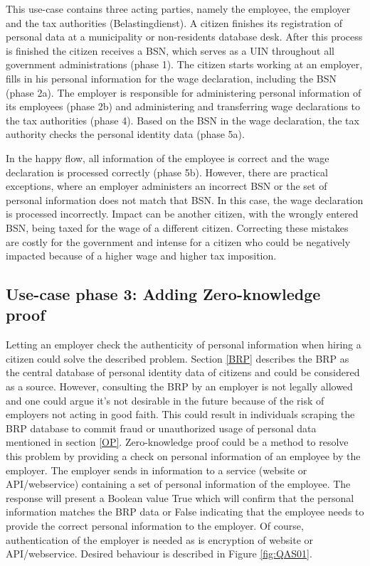 This use-case contains three acting parties, namely the employee, the employer and the tax authorities (Belastingdienst).
A citizen finishes its registration of personal data at a municipality or non-residents database desk. After this process is finished the citizen receives a BSN, which serves as a UIN throughout all government administrations (phase 1). The citizen starts working at an employer, fills in his personal information for the wage declaration, including the BSN (phase 2a). The employer is responsible for administering personal information of its employees (phase 2b) and administering and transferring wage declarations to the tax authorities (phase 4). Based on the BSN in the wage declaration, the tax authority checks the personal identity data (phase 5a). \par
In the happy flow, all information of the employee is correct and the wage declaration is processed correctly (phase 5b). However, there are practical exceptions, where an employer administers an incorrect BSN or the set of personal information does not match that BSN. In this case, the wage declaration is processed incorrectly. Impact can be another citizen, with the wrongly entered BSN, being taxed for the wage of a different citizen. Correcting these mistakes are costly for the government and intense for a citizen who could be negatively impacted because of a higher wage and higher tax imposition.

\subsection{Use-case phase 3: Adding Zero-knowledge proof}
Letting an employer check the authenticity of personal information when hiring a citizen could solve the described problem. Section \ref{BRP} describes the BRP as the central database of personal identity data of citizens and could be considered as a source. However, consulting the BRP by an employer is not legally allowed and one could argue it's not desirable in the future because of the risk of employers not acting in good faith. This could result in individuals scraping the BRP database to commit fraud or unauthorized usage of personal data mentioned in section \ref{OP}. Zero-knowledge proof could be a method to resolve this problem by providing a check on personal information of an employee by the employer. The employer sends in information to a service (website or API/webservice) containing a set of personal information of the employee. The response will present a Boolean value True which will confirm that the personal information matches the BRP data or False indicating that the employee needs to provide the correct personal information to the employer. Of course, authentication of the employer is needed as is encryption of website or API/webservice. Desired behaviour is described in Figure \ref{fig:QAS01}.

